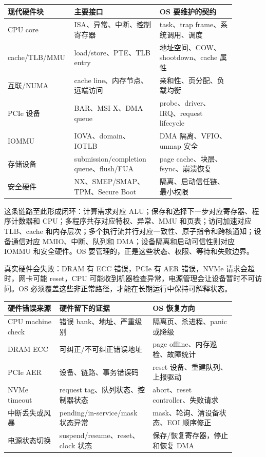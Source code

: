 \begin{longtable}{p{0.2\linewidth}p{0.36\linewidth}p{0.32\linewidth}}
\toprule
现代硬件块 & 主要接口 & OS 要维护的契约 \\
\midrule
CPU core & ISA、异常、中断、控制寄存器 & task、trap frame、系统调用、调度 \\
cache/TLB/MMU & load/store、PTE、TLB entry & 地址空间、COW、shootdown、cache 属性 \\
互联/NUMA & cache line、内存节点、远端访问 & 亲和性、页分配、负载均衡 \\
PCIe 设备 & BAR、MSI-X、DMA queue & probe、driver、IRQ、request lifecycle \\
IOMMU & IOVA、domain、IOTLB & DMA 隔离、VFIO、unmap 安全 \\
存储设备 & submission/completion queue、flush/FUA & page cache、块层、fsync、崩溃恢复 \\
安全硬件 & NX、SMEP/SMAP、TPM、Secure Boot & 隔离、启动信任链、最小权限 \\
\bottomrule
\end{longtable}

这条链路至此形成闭环：计算需求对应 ALU；保存和选择下一步对应寄存器、程序计数器和 CPU；多程序共存对应特权、异常、MMU 和页表；访问加速对应 TLB、cache 和内存层次；多个执行流并行对应一致性、原子指令和跨核通知；设备通信对应 MMIO、中断、队列和 DMA；设备隔离和启动可信性则对应 IOMMU 和安全硬件。OS 要管理的，正是这些状态、权限、等待和失败边界。

真实硬件会失败：DRAM 有 ECC 错误，PCIe 有 AER 错误，NVMe 请求会超时，网卡可能 reset，CPU 可能收到机器检查异常，电源管理会让设备暂时不可访问。OS 必须覆盖这些非正常路径，才能在长期运行中保持可解释状态。

\begin{longtable}{p{0.2\linewidth}p{0.36\linewidth}p{0.32\linewidth}}
\toprule
硬件错误来源 & 硬件留下的证据 & OS 恢复方向 \\
\midrule
CPU machine check & 错误 bank、地址、严重级别 & 隔离页、杀进程、panic 或降级 \\
DRAM ECC & 可纠正/不可纠正错误地址 & page offline、内存巡检、故障统计 \\
PCIe AER & 设备、链路、事务错误码 & reset 设备、重建队列、上报驱动 \\
NVMe timeout & request tag、队列状态、控制器状态 & abort、reset controller、失败请求 \\
中断丢失或风暴 & pending/in-service/mask 状态异常 & mask、轮询、清设备状态、EOI 顺序修正 \\
电源状态切换 & suspend/resume、reset、clock 状态 & 保存/恢复寄存器，停止和恢复 DMA \\
\bottomrule
\end{longtable}


